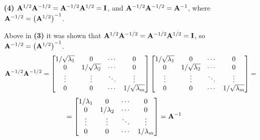 \begin{enumerate}[font=\bfseries]
\begin{enumerate}
            \item[\textbf{(4)}]{$\bold{A}^{1/2}\bold{A}^{-1/2} = \bold{A}^{-1/2}\bold{A}^{1/2} = \bold{I}$, and $\bold{A}^{-1/2}\bold{A}^{-1/2} = \bold{A}^{-1}$, where $\bold{A}^{-1/2} = {\left(\bold{A}^{1/2}\right)}^{-1}$.}
            \par
            Above in \textbf{(3)} it was shown that $\bold{A}^{1/2}\bold{A}^{-1/2} = \bold{A}^{-1/2}\bold{A}^{1/2} = \bold{I}$, so $\bold{A}^{-1/2} = {\left(\bold{A}^{1/2}\right)}^{-1}$.
            \[
                \bold{A}^{-1/2}\bold{A}^{-1/2} 
                = 
                \begin{bmatrix}
                    1/\sqrt{\lambda_1} & 0 & \cdots & 0 \\
                    0 & 1/\sqrt{\lambda_2} & \cdots & 0 \\
                    \vdots & \vdots & \ddots & \vdots \\
                    0 & 0 & \cdots & 1/\sqrt{\lambda_m}
                \end{bmatrix}
                \begin{bmatrix}
                    1/\sqrt{\lambda_1} & 0 & \cdots & 0 \\
                    0 & 1/\sqrt{\lambda_2} & \cdots & 0 \\
                    \vdots & \vdots & \ddots & \vdots \\
                    0 & 0 & \cdots & 1/\sqrt{\lambda_m}
                \end{bmatrix}
                =
            \]
            \[
                =
                \begin{bmatrix}
                    1/\lambda_1 & 0 & \cdots & 0 \\
                    0 & 1/\lambda_2 & \cdots & 0 \\
                    \vdots & \vdots & \ddots & \vdots \\
                    0 & 0 & \cdots & 1/\lambda_m
                \end{bmatrix}
                =
                \bold{A}^{-1}
            \]


\end{enumerate}
\end{enumerate}
